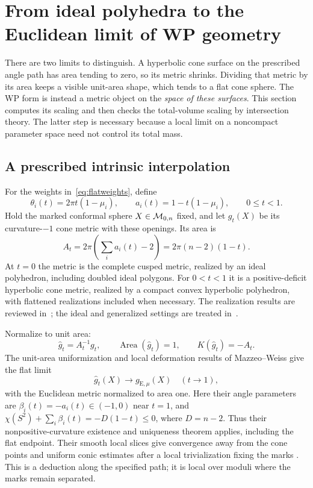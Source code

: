 \section{From ideal polyhedra to the Euclidean limit of WP geometry}
\label{sec:flatlimit}

There are two limits to distinguish. A hyperbolic cone surface on
the prescribed angle path has area tending to zero, so its metric
shrinks. Dividing that metric by its area keeps a visible unit-area
shape, which tends to a flat cone sphere. The WP form is instead a
metric object on the \emph{space of these surfaces}. This section
computes its scaling and then checks the total-volume scaling by
intersection theory. The latter step is necessary because a local
limit on a noncompact parameter space need not control its total mass.

\subsection{A prescribed intrinsic interpolation}

For the weights in~\eqref{eq:flatweights}, define
\begin{equation}
 \theta_i(t)=2\pi t(1-\mu_i),\qquad
 a_i(t)=1-t(1-\mu_i),\qquad 0\le t<1.
 \label{eq:anglepath}
\end{equation}
Hold the marked conformal sphere $X\in\mathcal M_{0,n}$ fixed, and let $g_t(X)$
be its curvature-$-1$ cone metric with these openings. Its area is
\begin{equation}
 A_t=2\pi\left(\sum_i a_i(t)-2\right)
    =2\pi(n-2)(1-t).
 \label{eq:areapath}
\end{equation}
At $t=0$ the metric is the complete cusped metric, realized by an ideal
polyhedron, including doubled ideal polygons. For $0<t<1$ it is a positive-deficit hyperbolic cone metric,
realized by a compact convex hyperbolic polyhedron, with flattened
realizations included when necessary. The realization results are
reviewed in~\cite{Fillastre}; the ideal and generalized settings are
treated in~\cite{RivinIntrinsic,Schlenker}.

Normalize to unit area:
\begin{equation}
 \widehat g_t=A_t^{-1}g_t,
 \qquad \operatorname{Area}(\widehat g_t)=1,
 \qquad K(\widehat g_t)=-A_t.
 \label{eq:unitareanormalization}
\end{equation}
The unit-area uniformization and local deformation results of
Mazzeo--Weiss give the flat limit
\begin{equation}
 \widehat g_t(X)\longrightarrow g_{\mathrm E,\mu}(X)
 \quad (t\to1),
 \label{eq:flatmetriclimit}
\end{equation}
with the Euclidean metric normalized to area one. Here their angle
parameters are $\beta_i(t)=-a_i(t)\in(-1,0)$ near $t=1$, and
$\chi(S^2)+\sum_i\beta_i(t)=-D(1-t)\le0$, where $D=n-2$.
Thus their nonpositive-curvature existence and uniqueness theorem
applies, including the flat endpoint. Their smooth local slices give
convergence away from the cone points and uniform conic estimates
after a local trivialization fixing the marks
\cite[Theorem 1, Section 6.1, and Proposition 16]{MazzeoWeiss}.
This is a deduction along the specified path; it is local over
moduli where the marks remain separated.

